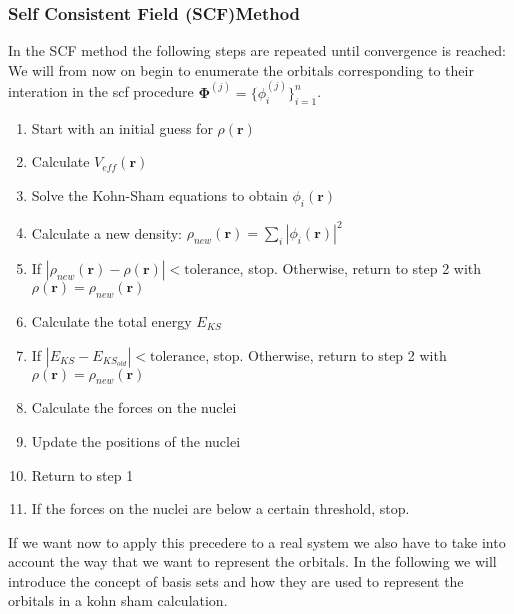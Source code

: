 \subsubsection{Self Consistent Field (SCF)Method}
In the SCF method the following steps are repeated until convergence is reached:
We will from now on begin to enumerate the orbitals corresponding to their interation in the scf procedure $\mathbf{\Phi}^{(j)} = \{\phi_i^{(j)}\}_{i=1}^n$.
\begin{enumerate}
    \item Start with an initial guess for $\rho(\mathbf{r})$
    \item Calculate $V_{eff}(\mathbf{r})$
    \item Solve the Kohn-Sham equations to obtain $\phi_i(\mathbf{r})$
    \item Calculate a new density: $\rho_{new}(\mathbf{r}) = \sum_i |\phi_i(\mathbf{r})|^2$
    \item If $|\rho_{new}(\mathbf{r}) - \rho(\mathbf{r})| < \text{tolerance}$, stop. Otherwise, return to step 2 with $\rho(\mathbf{r}) = \rho_{new}(\mathbf{r})$
    \item Calculate the total energy $E_{KS}$
    \item If $|E_{KS} - E_{KS_{old}}| < \text{tolerance}$, stop. Otherwise, return to step 2 with $\rho(\mathbf{r}) = \rho_{new}(\mathbf{r})$
    \item Calculate the forces on the nuclei
    \item Update the positions of the nuclei
    \item Return to step 1
    \item If the forces on the nuclei are below a certain threshold, stop.
\end{enumerate}
If we want now to apply this precedere to a real system we also have to take into account the way that we want to represent the orbitals. In the following we will introduce the concept of basis sets and how they are used to represent the orbitals in a kohn sham calculation.



















